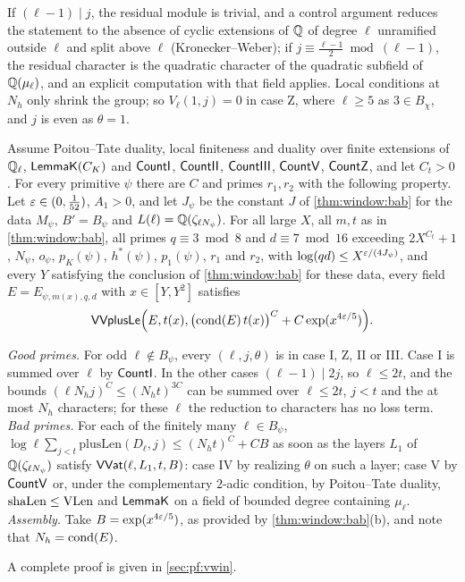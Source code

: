 If $(\ell-1)\mid j$, the residual module is trivial, and a control argument reduces the statement to the absence of
cyclic extensions of $\mathbb{Q}$ of degree $\ell$ unramified outside $\ell$ and split above $\ell$ (Kronecker--Weber); if
$j\equiv\frac{\ell-1}2\bmod(\ell-1)$, the residual character is the quadratic character of the quadratic subfield of
$\mathbb{Q}(\mu_\ell)$, and an explicit computation with that field applies. Local conditions at $N_h$ only shrink the group;
so $V_\ell(1,j)=0$ in case Z, where $\ell\ge5$ as $3\in B_\chi$, and $j$ is even as $\theta=1$.

\begin{theorem}\Fmark\label{thm:plus-part}
Assume Poitou--Tate duality, local finiteness and duality over finite extensions of $\mathbb{Q}_\ell$, $\mathsf{LemmaK}(C_K)$ and
$\mathsf{CountI}$, $\mathsf{CountII}$, $\mathsf{CountIII}$, $\mathsf{CountV}$, $\mathsf{CountZ}$, and let $C_t>0$. For
every primitive $\psi$ there are $C$ and primes $r_1,r_2$ with the following property. Let $\varepsilon\in(0,\frac1{52})$,
$A_1>0$, and let $J_\psi$ be the constant $J$ of \cref{thm:window:bab} for the data $M_\psi$, $B'=B_\psi$ and
$L(\ell)=\mathbb{Q}(\zeta_{\ell N_\psi})$. For all large $X$, all $m,t$ as in \cref{thm:window:bab}, all primes
$q\equiv3\bmod8$ and $d\equiv7\bmod16$ exceeding $2X^{C_t}+1$, $N_\psi$, $o_\psi$, $p_K(\psi)$, $h^*(\psi)$,
$p_1(\psi)$, $r_1$ and $r_2$, with $\log(qd)\le X^{\varepsilon/(4J_\psi)}$, and every $Y$ satisfying the conclusion of
\cref{thm:window:bab} for these data, every field $E=E_{\psi,m(x),q,d}$ with $x\in[Y,Y^2]$ satisfies
\[
 \mathsf{VVplusLe}\Bigl(E,t(x),\bigl(\operatorname{cond}(E)\,t(x)\bigr)^C+C\exp(x^{4\varepsilon/5})\Bigr).
\]
\end{theorem}

\begin{proofoutline}
\emph{Good primes.} For odd $\ell\notin B_\psi$, every $(\ell,j,\theta)$ is in case I, Z, II or III. Case I is
summed over $\ell$ by $\mathsf{CountI}$. In the other cases $(\ell-1)\mid2j$, so $\ell\le2t$, and the bounds
$(\ell N_hj)^C\le(N_ht)^{3C}$ can be summed over $\ell\le2t$, $j<t$ and the at most $N_h$ characters; for these $\ell$
the reduction to characters has no loss term. \emph{Bad primes.} For each of the finitely many $\ell\in B_\psi$,
$\log\ell\sum_{j<t}\mathrm{plusLen}(D_\ell,j)\le(N_ht)^C+CB$ as soon as the layers $L_1$ of $\mathbb{Q}(\zeta_{\ell N_\psi})$
satisfy $\mathsf{VVat}(\ell,L_1,t,B)$: case IV by realizing $\theta$ on such a layer; case V by $\mathsf{CountV}$ or,
under the complementary $2$-adic condition, by Poitou--Tate duality, $\mathrm{shaLen}\le\mathrm{VLen}$ and $\mathsf{LemmaK}$
on a field of bounded degree containing $\mu_\ell$. \emph{Assembly.} Take $B=\exp(x^{4\varepsilon/5})$, as provided by
\cref{thm:window:bab}(b), and note that $N_h=\operatorname{cond}(E)$.

A complete proof is given in \cref{sec:pf:vwin}.
\end{proofoutline}

